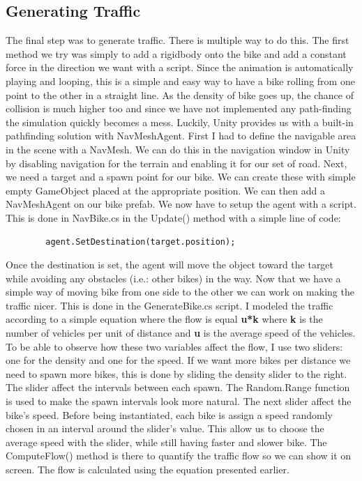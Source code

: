 \documentclass{scrartcl}
\begin{document}
    \subsection{Generating Traffic} 
        The final step was to generate traffic. There is
        multiple way to do this. The first method we try was simply to add a rigidbody
        onto the bike and add a constant force in the direction we want with a script.
        Since the animation is automatically playing and looping, this is a simple and
        easy way to have a bike rolling from one point to the other in a straight line.
        As the density of bike goes up, the chance of collision is much higher too and
        since we have not implemented any path-finding the simulation quickly becomes a
        mess. Luckily, Unity provides us with a built-in pathfinding solution with
        NavMeshAgent. First I had to define the navigable area in the scene with a
        NavMesh. We can do this in the navigation window in Unity by disabling
        navigation for the terrain and enabling it for our set of road. Next, we need a
        target and a spawn point for our bike. We can create these with simple empty
        GameObject placed at the appropriate position. We can then add a NavMeshAgent on
        our bike prefab. We now have to setup the agent with a script. This is done in
        NavBike.cs in the Update() method with a simple line of code:
		
        \begin{lstlisting} 
        agent.SetDestination(target.position); 
        \end{lstlisting}		

        Once the destination is set, the agent will move the object toward the target
        while avoiding any obstacles (i.e.: other bikes) in the way. Now that we have a
        simple way of moving bike from one side to the other we can work on making the
        traffic nicer. This is done in the GenerateBike.cs script. I modeled the traffic
        according to a simple equation where the flow is equal \textbf{u*k} where
        \textbf{k} is the number of vehicles per unit of distance and \textbf{u} is the
        average speed of the vehicles. To be able to observe how these two variables
        affect the flow, I use two sliders: one for the density and one for the speed.
        If we want more bikes per distance we need to spawn more bikes, this is done by
        sliding the density slider to the right. The slider affect the intervals between
        each spawn. The Random.Range function is used to make the spawn intervals look
        more natural. The next slider affect the bike's speed. Before being
        instantiated, each bike is assign a speed randomly chosen in an interval around
        the slider's value. This allow us to choose the average speed with the slider,
        while still having faster and slower bike. The ComputeFlow() method is there to
        quantify the traffic flow so we can show it on screen. The flow is calculated
        using the equation presented earlier.
		
\end{document}
